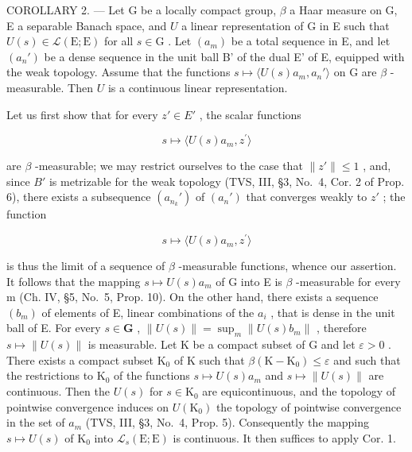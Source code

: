 COROLLARY 2. --- Let G be a locally compact group, \(\beta\) a Haar measure on G, E a separable Banach space, and \(U\) a linear representation of G in E such that \(U(s) \in \mathcal{L}(\mathrm{E};\mathrm{E})\) for all \(s \in \mathrm{G}\) . Let \((a_m)\) be a total sequence in E, and let \((a_n')\) be a dense sequence in the unit ball B' of the dual E' of E, equipped with the weak topology. Assume that the functions \(s \mapsto \langle U(s)a_m, a_n' \rangle\) on G are \(\beta\) -measurable. Then \(U\) is a continuous linear representation.

Let us first show that for every \(z' \in E'\) , the scalar functions

\[
s \mapsto \langle U (s) a _ {m}, z ^ {\prime} \rangle
\]

are \(\beta\) -measurable; we may restrict ourselves to the case that \(\|z'\| \leqslant 1\) , and, since \(B'\) is metrizable for the weak topology (TVS, III, §3, No.~4, Cor. 2 of Prop. 6), there exists a subsequence \((a_{n_k}')\) of \((a_n')\) that converges weakly to \(z'\) ; the function

\[
s \mapsto \langle U (s) a _ {m}, z ^ {\prime} \rangle
\]

is thus the limit of a sequence of \(\beta\) -measurable functions, whence our assertion. It follows that the mapping \(s \mapsto U(s)a_{m}\) of G into E is \(\beta\) -measurable for every m (Ch. IV, §5, No.~5, Prop. 10). On the other hand, there exists a sequence \((b_{m})\) of elements of E, linear combinations of the \(a_{i}\) , that is dense in the unit ball of E. For every \(s \in \mathbf{G}\) , \(\|U(s)\| = \sup_{m} \|U(s)b_{m}\|\) , therefore \(s \mapsto \|U(s)\|\) is measurable. Let K be a compact subset of G and let \(\varepsilon > 0\) . There exists a compact subset \(\mathrm{K}_{0}\) of K such that \(\beta(\mathrm{K} - \mathrm{K}_{0}) \leqslant \varepsilon\) and such that the restrictions to \(\mathrm{K}_{0}\) of the functions \(s \mapsto U(s)a_{m}\) and \(s \mapsto \|U(s)\|\) are continuous. Then the \(U(s)\) for \(s \in \mathrm{K}_{0}\) are equicontinuous, and the topology of pointwise convergence induces on \(U(\mathrm{K}_{0})\) the topology of pointwise convergence in the set of \(a_{m}\) (TVS, III, §3, No.~4, Prop. 5). Consequently the mapping \(s \mapsto U(s)\) of \(\mathrm{K}_{0}\) into \(\mathcal{L}_{s}(\mathrm{E};\mathrm{E})\) is continuous. It then suffices to apply Cor. 1.

